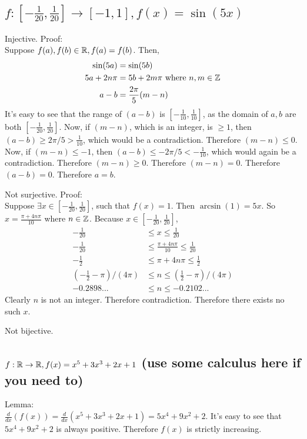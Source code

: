     \subsection{$f: [ -\frac{1}{20}, \frac{1}{20}] \to [-1, 1], f(x) = \sin(5x)$}
        Injective. Proof: \\ 
        Suppose $f(a), f(b) \in \mathbb{R}, f(a) = f(b)$.
        Then,
        \begin{align*}
            \sin(5a) &= \sin(5b) \\ 
            5a + 2n\pi &= 5b + 2m\pi \text{ where } n, m \in \mathbb{Z} \\ 
            a - b &= \frac{2\pi}{5} (m - n)
        \end{align*}
        It's easy to see that the range of 
        $(a - b)$ is $[ -\frac{1}{10}, \frac{1}{10}]$,
        as the domain of $a, b$ are both $[ -\frac{1}{20}, \frac{1}{20}]$.
        Now, if $(m - n)$, which is an integer, is $\geq 1$,
        then $(a - b) \geq 2\pi/5 > \frac{1}{10}$, 
        which would be a contradiction.
        Therefore $(m - n) \leq 0$.
        Now, if $(m - n) \leq -1$,
        then $(a - b) \leq -2\pi/5 < -\frac{1}{10}$, 
        which would again be a contradiction.
        Therefore $(m - n) \geq 0$.
        Therefore $(m - n) = 0$.
        Therefore $(a - b) = 0$.
        Therefore $a = b$.

        Not surjective. Proof: \\ 
        Suppose $\exists x \in [ -\frac{1}{20}, \frac{1}{20}]$, 
        such that $ f(x) = 1$.
        Then $\arcsin(1) = 5x$.
        So $x = \frac{\pi + 4n\pi}{10}$ where $n \in \mathbb{Z}$.
        Because $x \in [ -\frac{1}{20}, \frac{1}{20}]$,
        \begin{align*}
            - \frac{1}{20} &\leq x \leq \frac{1}{20} \\ 
            - \frac{1}{20} &\leq \frac{\pi + 4n\pi}{10} \leq \frac{1}{20} \\ 
            - \frac{1}{2} &\leq \pi + 4n\pi \leq \frac{1}{2} \\ 
            (- \frac{1}{2} - \pi)/(4\pi) &\leq n \leq (\frac{1}{2} - \pi)/(4\pi) \\ 
            -0.2898... &\leq n \leq -0.2102... 
        \end{align*} 
        Clearly $n$ is not an integer. 
        Therefore contradiction. 
        Therefore there exists no such $x$.

        Not bijective.

    \newpage
    \subsection{$f: \mathbb{R} \to \mathbb{R} , f(x) = x^5 + 3x^3 + 2x + 1$  (use some calculus here if you need to)}
        Lemma: \\ 
            $\frac{d}{dx}(f(x)) = \frac{d}{dx}(x^5 + 3x^3 + 2x + 1) = 5x^4 + 9x^2 + 2$.
            It's easy to see that $5x^4 + 9x^2 + 2$ is always positive.
            Therefore $f(x)$ is strictly increasing.


